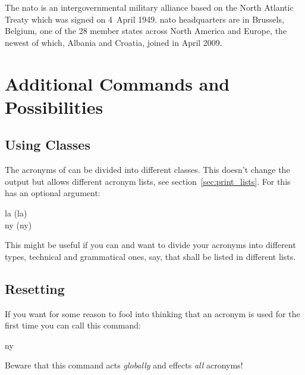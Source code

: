 \documentclass[DIV10,toc=index,toc=bib]{cnpkgdoc}
\begin{document}
\begin{beispiel}
 The \ac{nato} is an intergovernmental military alliance based on the
 North Atlantic Treaty which was signed on 4~April 1949. \ac{nato}
 headquarters are in Brussels, Belgium, one of the 28 member states
 across North America and Europe, the newest of which, Albania and
 Croatia, joined in April 2009.
\end{beispiel}

\section{Additional Commands and Possibilities}
\subsection{Using Classes}
The acronyms of \acro can be divided into different classes. This doesn't change
the output but allows different acronym lists, see section~\ref{sec:print_lists}.
For this  has an optional argument:
\begin{beschreibung}
\end{beschreibung}
\begin{beispiel}
 \acl{la} (\acs{la}) \\
 \acl{ny} (\acs{ny})
\end{beispiel}
This might be useful if you can and want to divide your acronyms into different
types, technical and grammatical ones, say, that shall be listed in different
lists.

\subsection{Resetting}
If you want for some reason to fool \acro into thinking that an acronym is used
for the first time you can call this command:
\begin{beschreibung}
\end{beschreibung}
\begin{beispiel}
 \acresetall
 \ac{ny}
\end{beispiel}
Beware that this command acts \emph{globally} and effects \emph{all} acronyms!
\end{document}

